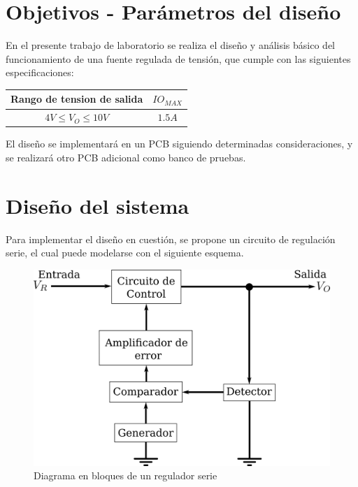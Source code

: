 



\tableofcontents
\newpage

\section{Objetivos - Par\'ametros del dise\~no}

En el presente trabajo de laboratorio se realiza el diseño y an\'alisis b\'asico del funcionamiento de una fuente regulada de tensi\'on, que cumple con las siguientes especificaciones:

\begin{center}
\begin{tabular}{|c|c|}
\hline 
Rango de tension de salida & $IO_{MAX}$\\
\hline 
\hline 
$4V \leq V_O \leq 10V$ & $1.5A$\\
\hline 
\end{tabular}
\end{center}

El diseño se implementar\'a en un PCB siguiendo determinadas consideraciones, y se realizar\'a otro PCB adicional como banco de pruebas.

\section{Dise\~no del sistema}

Para implementar el dise\~no en cuesti\'on, se propone un circuito de regulaci\'on serie, el cual puede modelarse con el siguiente esquema.

\begin{figure}[!h]
\begin{centering}
\includegraphics[scale=0.35]{Imagenes/bloquesSerie.png}
\par\end{centering}
\caption{Diagrama en bloques de un regulador serie}

\end{figure}

